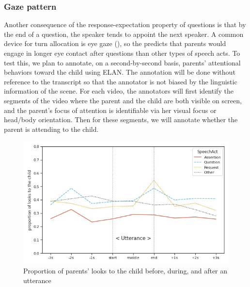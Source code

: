 \subsubsection{Gaze pattern}
\label{sec:engsp:results:gaze}



Another consequence of the response-expectation property of questions is that by the end of a question, the speaker tends to appoint the next speaker. A common device for turn allocation is eye gaze (\citealt{argyle1972gaze, kendon1967gaze,duncan1979gaze, rossano2009gaze}), so the \hypos{} predicts that parents would engage in longer eye contact after questions than other types of speech acts. To test this, we plan to annotate, on a second-by-second basis, parents' attentional behaviors toward the child using ELAN. The annotation will be done without reference to the transcript so that the annotator is not biased by the linguistic information of the scene. For each video, the annotators will first identify the segments of the video where the parent and the child are both visible on screen, and the parent’s focus of attention is identifiable via her visual focus or head/body orientation. Then for these segments, we will annotate whether the parent is attending to the child.  


\begin{figure}[H]

\begin{center}
	\includegraphics[width =1\textwidth]{figures/gaze-pattern-adult.jpg}
	\caption{Proportion of parents' looks to the child before, during, and after an utterance} \label{fg:attention}
\end{center}
\end{figure}



